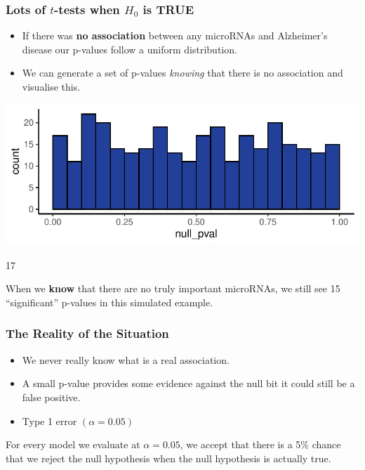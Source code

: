 \documentclass[a4paper]{article}\usepackage[]{graphicx}\usepackage[]{xcolor}
\makeatletter
\def\maxwidth{ %
  \ifdim\Gin@nat@width>\linewidth
    \linewidth
  \else
    \Gin@nat@width
  \fi
}
\makeatother
\begin{document}
\subsubsection{Lots of \( t \)-tests when \( H_0 \) is TRUE}
\begin{itemize}
	\item If there was \textbf{no association} between any microRNAs and Alzheimer's disease our p-values follow a uniform distribution.
	\item We can generate a set of p-values \textit{knowing} that there is no association and visualise this.
\end{itemize}
\begin{Schunk}


{\centering \includegraphics[width=\maxwidth]{figure/listings-unnamed-chunk-206-1} 

}

\begin{Soutput}
[1] 17
\end{Soutput}
\end{Schunk}
When we \textbf{know} that there are no truly important microRNAs, we still see 15 ``significant'' p-values in this simulated example.
\subsubsection{The Reality of the Situation}
\begin{itemize}
	\item We never really know what is a real association.
	\item A small p-value provides some evidence against the null bit it could still be a false positive.
	\item Type 1 error \( (\alpha = 0.05) \) 
\end{itemize}
\begin{goldbox}
	For every model we evaluate at \( \alpha = 0.05 \), we accept that there is a 5\% chance that we \textcolor{myred}{reject the null hypothesis} when \textcolor{mygreen}{the null hypothesis is actually true}.
\end{goldbox}
\end{document}
